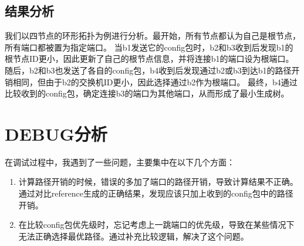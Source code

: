 \documentclass[11pt]{article}
\begin{document}
\subsection{结果分析}
我们以四节点的环形拓扑为例进行分析。最开始，所有节点都认为自己是根节点，所有端口都被置为指定端口。
当b1发送它的config包时，b2和b3收到后发现b1的根节点ID更小，因此更新了自己的根节点信息，并将连接b1的端口设为根端口。
随后，b2和b3也发送了各自的config包，b4收到后发现通过b2或b3到达b1的路径开销相同，但由于b2的交换机ID更小，因此选择通过b2作为根端口。
最终，b4通过比较收到的config包，确定连接b3的端口为其他端口，从而形成了最小生成树。

\section{DEBUG分析}
在调试过程中，我遇到了一些问题，主要集中在以下几个方面：
\begin{enumerate}
	\item 计算路径开销的时候，错误的多加了端口的路径开销，导致计算结果不正确。通过对比reference生成的正确结果，发现应该只加上收到的config包中的路径开销。
	\item 在比较config包优先级时，忘记考虑上一跳端口的优先级，导致在某些情况下无法正确选择最优路径。通过补充比较逻辑，解决了这个问题。
\end{enumerate}
\end{document}
